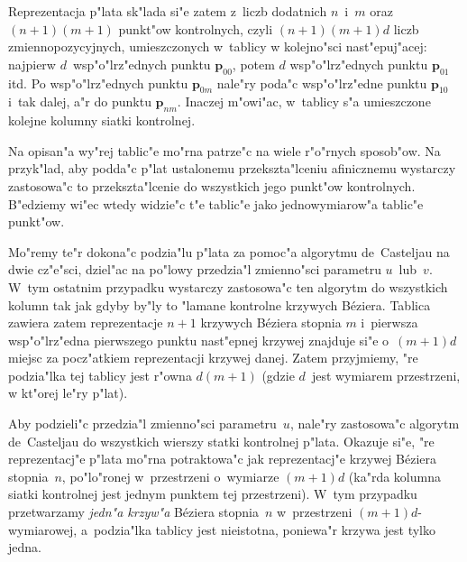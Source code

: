 Reprezentacja p"lata sk"lada si"e zatem z~liczb dodatnich $n$~i~$m$ oraz
$(n+1)(m+1)$ punkt"ow kontrolnych, czyli $(n+1)(m+1)d$ liczb
zmiennopozycyjnych,
umieszczonych w~tablicy w kolejno"sci nast"epuj"acej: najpierw
$d$~wsp"o"lrz"ednych punktu $\bm{p}_{00}$, potem $d$ wsp"o"lrz"ednych
punktu $\bm{p}_{01}$ itd. Po wsp"o"lrz"ednych punktu $\bm{p}_{0m}$ nale"ry
poda"c wsp"o"lrz"edne punktu $\bm{p}_{10}$ i~tak dalej, a"r do punktu
$\bm{p}_{nm}$. Inaczej m"owi"ac, w~tablicy s"a umieszczone kolejne kolumny
siatki kontrolnej.

Na opisan"a wy"rej tablic"e mo"rna patrze"c na wiele r"o"rnych sposob"ow.
Na przyk"lad, aby podda"c p"lat ustalonemu przekszta"lceniu afinicznemu
wystarczy zastosowa"c to przekszta"lcenie do wszystkich jego punkt"ow
kontrolnych. B"edziemy wi"ec wtedy widzie"c t"e tablic"e jako jednowymiarow"a
tablic"e punkt"ow.

Mo"remy te"r dokona"c podzia"lu p"lata za pomoc"a
algorytmu de~Casteljau na dwie cz"e"sci, dziel"ac na po"lowy przedzia"l
zmienno"sci parametru $u$~lub~$v$. W~tym ostatnim przypadku wystarczy
zastosowa"c ten algorytm do wszystkich kolumn tak jak gdyby by"ly to "lamane
kontrolne krzywych B\'{e}ziera. Tablica zawiera zatem reprezentacje $n+1$
krzywych B\'{e}ziera stopnia $m$ i~pierwsza wsp"o"lrz"edna pierwszego punktu
nast"epnej krzywej znajduje si"e o~$(m+1)d$ miejsc za pocz"atkiem
reprezentacji krzywej danej. Zatem przyjmiemy, "re podzia"lka tej tablicy
jest r"owna $d(m+1)$ (gdzie $d$~jest wymiarem przestrzeni, w kt"orej le"ry
p"lat).

Aby podzieli"c przedzia"l zmienno"sci parametru~$u$, nale"ry zastosowa"c
algorytm de~Casteljau do wszystkich wierszy statki kontrolnej p"lata.
Okazuje si"e, "re reprezentacj"e
p"lata mo"rna potraktowa"c jak reprezentacj"e krzywej B\'{e}ziera
stopnia~$n$, po"lo"ronej w~przestrzeni o~wymiarze $(m+1)d$ (ka"rda kolumna
siatki kontrolnej jest jednym punktem tej przestrzeni). W~tym przypadku
przetwarzamy \emph{jedn"a krzyw"a} B\'{e}ziera stopnia~$n$ w~przestrzeni
$(m+1)d$-wymiarowej, a~podzia"lka tablicy jest nieistotna, poniewa"r krzywa
jest tylko jedna.

